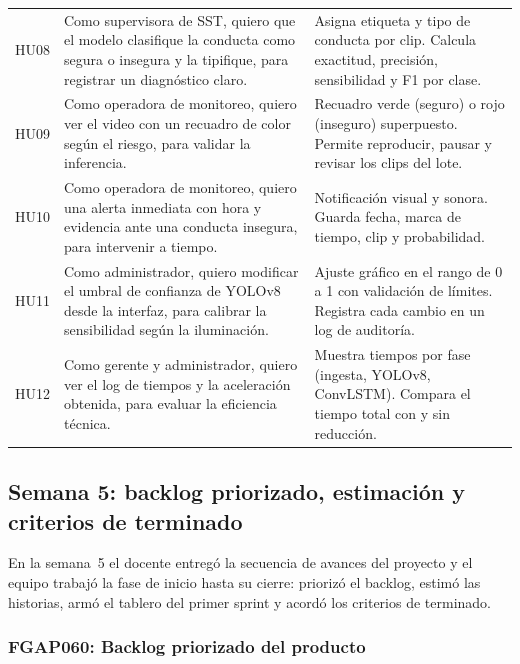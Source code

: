\documentclass[12pt,a4paper]{article}
\begin{document}
\begin{longtable}{C{1.1cm} P{6.4cm} P{6.9cm}}
HU08 & Como supervisora de SST, quiero que el modelo clasifique la conducta como segura o insegura y la tipifique, para registrar un diagnóstico claro. & Asigna etiqueta y tipo de conducta por clip. Calcula exactitud, precisión, sensibilidad y F1 por clase.\\
HU09 & Como operadora de monitoreo, quiero ver el video con un recuadro de color según el riesgo, para validar la inferencia. & Recuadro verde (seguro) o rojo (inseguro) superpuesto. Permite reproducir, pausar y revisar los clips del lote.\\
HU10 & Como operadora de monitoreo, quiero una alerta inmediata con hora y evidencia ante una conducta insegura, para intervenir a tiempo. & Notificación visual y sonora. Guarda fecha, marca de tiempo, clip y probabilidad.\\
HU11 & Como administrador, quiero modificar el umbral de confianza de YOLOv8 desde la interfaz, para calibrar la sensibilidad según la iluminación. & Ajuste gráfico en el rango de 0 a 1 con validación de límites. Registra cada cambio en un log de auditoría.\\
HU12 & Como gerente y administrador, quiero ver el log de tiempos y la aceleración obtenida, para evaluar la eficiencia técnica. & Muestra tiempos por fase (ingesta, YOLOv8, ConvLSTM). Compara el tiempo total con y sin reducción.\\
\end{longtable}
\endgroup


\FloatBarrier
\subsection{Semana 5: backlog priorizado, estimación y criterios de terminado}

En la semana~5 el docente entregó la secuencia de avances del proyecto y el equipo trabajó la fase de inicio hasta su cierre: priorizó el backlog, estimó las historias, armó el tablero del primer sprint y acordó los criterios de terminado.

\FloatBarrier
\subsubsection{FGAP060: Backlog priorizado del producto}
\end{document}
